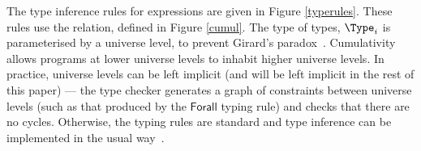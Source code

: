 \label{sect:typerules}

The type inference rules for \TT{} expressions are given in Figure \ref{typerules}.
These rules use the  relation, defined in 
Figure \ref{cumul}. The type of types, $\Type_i$ is parameterised by a universe level,
to prevent Girard's paradox~\cite{coquand1986analysis}. Cumulativity allows programs at
lower universe levels to inhabit higher universe levels. In practice, universe levels
can be left implicit (and will be left implicit in the rest of this paper) ---
the type checker generates a graph of constraints between universe levels (such
as that produced by the $\mathsf{Forall}$ typing rule) and checks that there
are no cycles. Otherwise, the typing rules are standard and type inference can
be implemented in the usual way~\cite{loh2010tutorial}.

